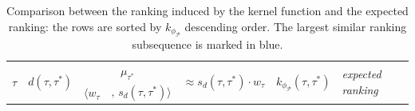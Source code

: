 \begin{table}[!t]
	\caption{Comparison between the ranking induced by the kernel function and the expected ranking: the rows are sorted by $k_{\phi_{\mathcal{P}}}$ descending order. The largest similar ranking subsequence is marked in blue.}\label{tab:rank3}
	\centering
%		

	\begin{tabular}{lc|ll|cc|l}
	\toprule
	
	\multirow{2}{*}{$\tau$} & 
	\multirow{2}{*}{$d(\tau,\tau^*)$} & 
	\multicolumn{2}{c|}{$\mu_{\tau^*}$} &
	\multirow{2}{*}{$\approx s_d(\tau,\tau^*)\cdot w_\tau$} &
	\multirow{2}{*}{$k_{\phi_{\mathcal{P}}}(\tau,\tau^*)$}&
	\multirow{2}{*}{\textit{expected ranking}}\\
	
	\cline{3-4} &&  $\langle w_\tau$ &  $,\,s_d(\tau,\tau^*)\rangle $ && \\
	

\end{tabular}
\end{table}
